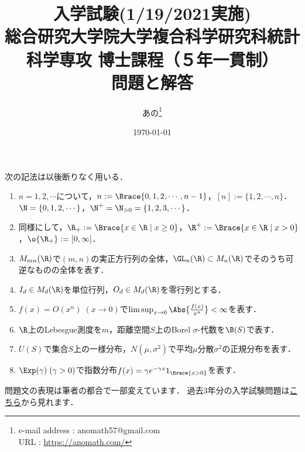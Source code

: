 \documentclass[uplatex,dvipdfmx]{jsarticle}
\title{{\huge 入学試験(1/19/2021実施)}\\
{\Large 総合研究大学院大学複合科学研究科統計科学専攻
博士課程（５年一貫制）}\\
{\LARGE 問題と解答}}
\author{あの\footnote{e-mail address : anomath57@gmail.com\\URL : \url{https://anomath.com/}}}
\date{\today}
\begin{document}
\maketitle

\begin{tcolorbox}[title=記法についての注意]
    次の記法は以後断りなく用いる．
    \begin{enumerate}
        \item $n=1,2,\cdots$について，$n:=\Brace{0,1,2,\cdots,n-1}$，$[n]:=\{1,2,\cdots,n\}$．$\N=\{0,1,2,\cdots\}$，$\N^+=\N_{>0}=\{1,2,3,\cdots\}$．
        \item 同様にして，$\R_+:=\Brace{x\in\R\mid x\ge0}$，$\R^+:=\Brace{x\in\R\mid x>0}$，$\o{\R_+}:=[0,\infty]$．
        \item $M_{mn}(\R)$で$(m,n)$の実正方行列の全体，$\GL_n(\R)\subset M_n(\R)$でそのうち可逆なものの全体を表す．
        \item $I_d\in M_d(\R)$を単位行列，$O_d\in M_d(\R)$を零行列とする．
        \item $f(x)=O(x^n)\;(x\to0)$で$\limsup_{x\to0}\Abs{\frac{f(x)}{x^n}}<\infty$を表す．
        \item $\R$上のLebesgue測度を$m$，距離空間$S$上のBorel $\sigma$-代数を$\B(S)$で表す．
        \item $U(S)$で集合$S$上の一様分布，$N(\mu,\sigma^2)$で平均$\mu$分散$\sigma^2$の正規分布を表す．
        \item $\Exp(\gamma)\;(\gamma>0)$で指数分布$f(x)=\gamma e^{-\gamma x}1_{\Brace{x>0}}$を表す．
    \end{enumerate}
    問題文の表現は筆者の都合で一部変えています．
    過去3年分の入学試験問題は\href{https://www.ism.ac.jp/senkou/admission/kakomon.html}{こちら}から見れます．
\end{tcolorbox}
\vspace{1cm}
\end{document}
